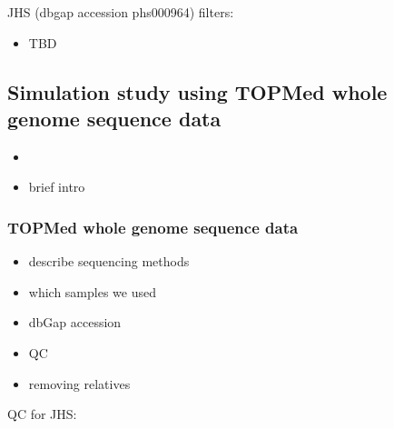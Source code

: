 \documentclass[12pt]{article}
\newcommand{\edit}[1]{{\color{red}{#1}}}
\newcommand{\add}[1]{{\color{red}{[... #1 ...]}}}
\begin{document}
\add{Comment on both PCA and model-based approaches (e.g., ADMIXTURE, RFMix, other ancestry inference software)}

JHS (dbgap accession phs000964) filters:

\begin{itemize}
\item TBD
\end{itemize}

\subsection{Simulation study using TOPMed whole genome sequence data}

\begin{itemize}
\item \edit{Need to decide if we're using TOPMed or WHI data}
\item brief intro
\end{itemize}


\subsubsection{TOPMed whole genome sequence data}

\begin{itemize}
\item describe sequencing methods
\item which samples we used
\item dbGap accession
\item QC
\item removing relatives
\end{itemize}


QC for JHS: 
\end{document}
